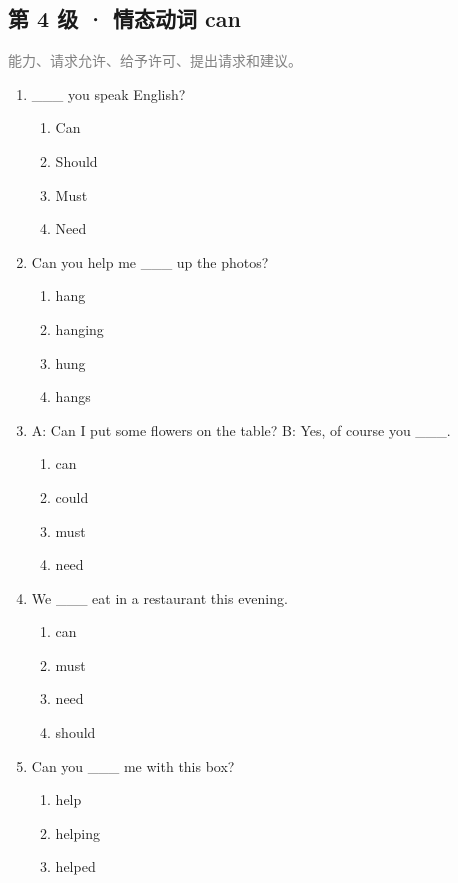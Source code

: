\documentclass[11pt,a4paper]{ctexart}
\begin{document}
\subsection*{第 4 级 · 情态动词 can}
\noindent\textcolor{gray}{能力、请求允许、给予许可、提出请求和建议。}\par\smallskip
\begin{enumerate}[leftmargin=*,itemsep=4pt]
\item \_\_\_ you speak English?
\begin{enumerate}[label=\Alph*.,leftmargin=2em,itemsep=1pt,topsep=2pt]
\item Can
\item Should
\item Must
\item Need
\end{enumerate}
\item Can you help me \_\_\_ up the photos?
\begin{enumerate}[label=\Alph*.,leftmargin=2em,itemsep=1pt,topsep=2pt]
\item hang
\item hanging
\item hung
\item hangs
\end{enumerate}
\item A: Can I put some flowers on the table? B: Yes, of course you \_\_\_.
\begin{enumerate}[label=\Alph*.,leftmargin=2em,itemsep=1pt,topsep=2pt]
\item can
\item could
\item must
\item need
\end{enumerate}
\item We \_\_\_ eat in a restaurant this evening.
\begin{enumerate}[label=\Alph*.,leftmargin=2em,itemsep=1pt,topsep=2pt]
\item can
\item must
\item need
\item should
\end{enumerate}
\item Can you \_\_\_ me with this box?
\begin{enumerate}[label=\Alph*.,leftmargin=2em,itemsep=1pt,topsep=2pt]
\item help
\item helping
\item helped

\end{enumerate}
\end{enumerate}
\end{document}
